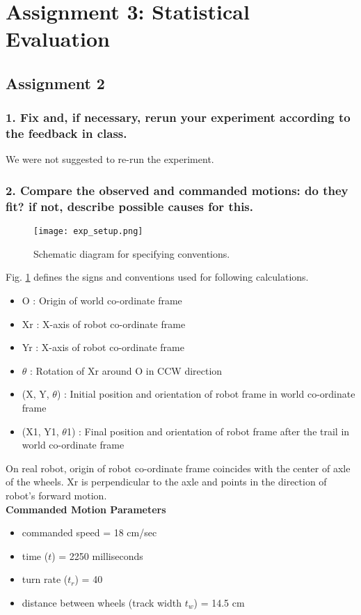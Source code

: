 \section*{Assignment 3: Statistical Evaluation}
\subsection*{Assignment 2}
\subsubsection*{1. Fix and, if necessary, rerun your experiment according to the feedback in class.}
We were not suggested to re-run the experiment.

\subsubsection*{2. Compare the observed and commanded motions: do they fit? if not, describe possible causes for this.} 

\begin{figure}[H]
\centering
\texttt{[image: exp\_setup.png]}
\caption{Schematic diagram for specifying conventions.}
\label{schematic-convention}
\end{figure}

Fig. \ref{schematic-convention} defines the signs and conventions used for following calculations. 
\begin{itemize}
	\item O : Origin of world co-ordinate frame
	\item Xr : X-axis of robot co-ordinate frame 
	\item Yr : X-axis of robot co-ordinate frame
	\item $\theta$ : Rotation of Xr around O in CCW direction
	\item (X, Y, $\theta$) :  Initial position and orientation of robot frame in world co-ordinate frame
	\item (X1, Y1, $\theta$1) : Final position and orientation of robot frame after the trail in world co-ordinate frame
\end{itemize}

On real robot, origin of robot co-ordinate frame coincides with the center of axle of the wheels. Xr is perpendicular to the axle and points in the direction of robot's forward motion. \\

\textbf{Commanded Motion Parameters}
\begin{itemize}
	\item commanded speed = 18 cm/sec
	\item time ($t$) = 2250 milliseconds
	\item turn rate ($t_r$) = 40 
	\item distance between wheels (track width $t_w$) = 14.5 cm 
\end{itemize}

